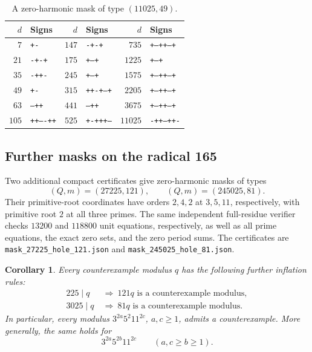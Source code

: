 \documentclass[11pt]{amsart}
\newtheorem{corollary}[theorem]{Corollary}
\theoremstyle{definition}
\theoremstyle{remark}
\numberwithin{equation}{section}
\begin{document}
\begin{table}[ht]
\centering
\begin{tabular}{r l@{\qquad}r l@{\qquad}r l}
\hline
$d$ & Signs & $d$ & Signs & $d$ & Signs \\
\hline
$7$ & \texttt{+-} & $147$ & \texttt{-+-+} & $735$ & \texttt{+--++--+}\\
$21$ & \texttt{-+-+} & $175$ & \texttt{+--+} & $1225$ & \texttt{+--+}\\
$35$ & \texttt{-++-} & $245$ & \texttt{+--+} & $1575$ & \texttt{+--++--+}\\
$49$ & \texttt{+-} & $315$ & \texttt{++-+---+} & $2205$ & \texttt{+--++--+}\\
$63$ & \texttt{--++} & $441$ & \texttt{--++} & $3675$ & \texttt{+--++--+}\\
$105$ & \texttt{++----++} & $525$ & \texttt{+-+++---} & $11025$ & \texttt{-++--++-}\\
\hline
\end{tabular}
\caption{A zero-harmonic mask of type $(11025,49)$.}
\label{tab:49-mask}
\end{table}

\subsection{Further masks on the radical 165}

Two additional compact certificates give zero-harmonic masks of types
\[
 (Q,m)=(27225,121),\qquad (Q,m)=(245025,81).
\]
Their primitive-root coordinates have orders $2,4,2$ at $3,5,11$,
respectively, with primitive root $2$ at all three primes. The same independent
full-residue verifier checks $13200$ and $118800$ unit equations,
respectively, as well as all prime equations, the exact zero sets, and the
zero period sums. The certificates are
\texttt{mask\_27225\_hole\_121.json} and
\texttt{mask\_245025\_hole\_81.json}.

\begin{corollary}
Every counterexample modulus $q$ has the following further inflation rules:
\[
 \begin{aligned}
 225\mid q&\ \Longrightarrow\ 121q\text{ is a counterexample modulus},\\
 3025\mid q&\ \Longrightarrow\ 81q\text{ is a counterexample modulus}.
 \end{aligned}
\]
In particular, every modulus $3^{2a}5^2 11^{2c}$, $a,c\ge1$, admits a
counterexample. More generally, the same holds for
\[
 3^{2a}5^{2b}11^{2c}\qquad(a,c\ge b\ge1).
\]
\end{corollary}
\end{document}
